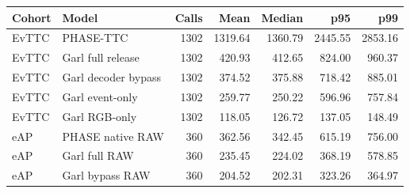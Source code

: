 \begin{tabular}{llrrrrr}
\toprule
Cohort & Model & Calls & Mean & Median & p95 & p99 \\
\midrule
EvTTC & PHASE-TTC & 1302 & 1319.64 & 1360.79 & 2445.55 & 2853.16 \\
EvTTC & Garl full release & 1302 & 420.93 & 412.65 & 824.00 & 960.37 \\
EvTTC & Garl decoder bypass & 1302 & 374.52 & 375.88 & 718.42 & 885.01 \\
EvTTC & Garl event-only & 1302 & 259.77 & 250.22 & 596.96 & 757.84 \\
EvTTC & Garl RGB-only & 1302 & 118.05 & 126.72 & 137.05 & 148.49 \\
eAP & PHASE native RAW & 360 & 362.56 & 342.45 & 615.19 & 756.00 \\
eAP & Garl full RAW & 360 & 235.45 & 224.02 & 368.19 & 578.85 \\
eAP & Garl bypass RAW & 360 & 204.52 & 202.31 & 323.26 & 364.97 \\
\bottomrule
\end{tabular}
